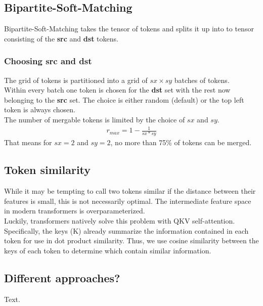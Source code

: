 \subsection{Bipartite-Soft-Matching}
Bipartite-Soft-Matching takes the tensor of tokens and splits it up into to tensor consisting of the \textbf{src} and \textbf{dst} tokens. 

\subsubsection*{Choosing src and dst}
The grid of tokens is partitioned into a grid of \(sx \times sy\) batches of tokens.\\
Within every batch one token is chosen for the \textbf{dst} set with the rest now belonging to the \textbf{src} set. The choice is either random (default) or the top left token is always chosen.\\
The number of mergable tokens is limited by the choice of \(sx\) and \(sy\).
\begin{align*}
    r_{max} = 1-\frac{1}{sx*sy}
\end{align*}
That means for \(sx = 2\) and \(sy = 2\), no more than 75\% of tokens can be merged.

\subsection{Token similarity}
While it may be tempting to call two tokens similar if the distance between their features is small, this is not necessarily optimal. The intermediate feature space in modern transformers is overparameterized.\\ Luckily, transformers natively solve this problem with QKV self-attention\cite{vaswani2017attention}.
Specifically, the keys (K) already summarize the information contained in each token for use in dot product similarity. Thus, we use cosine similarity between the keys of each token to determine which contain similar information\cite{bolya2023tome}.

\subsection{Different approaches?}
Text.

